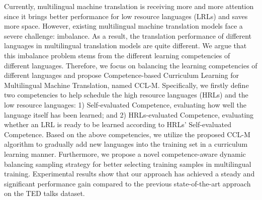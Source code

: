 Currently, multilingual machine translation is receiving more and more attention since it brings better performance for low resource languages (LRLs) and saves more space. However, existing multilingual machine translation models face a severe challenge: imbalance. As a result, the translation performance of different languages in multilingual translation models are quite different. We argue that this imbalance problem stems from the different learning competencies of different languages. Therefore, we focus on balancing the learning competencies of different languages and propose Competence-based Curriculum Learning for Multilingual Machine Translation, named CCL-M. Specifically, we firstly define two competencies to help schedule the high resource languages (HRLs) and the low resource languages: 1) Self-evaluated Competence, evaluating how well the language itself has been learned; and 2) HRLs-evaluated Competence, evaluating whether an LRL is ready to be learned according to HRLs' Self-evaluated Competence. Based on the above competencies, we utilize the proposed CCL-M algorithm to gradually add new languages into the training set in a curriculum learning manner. Furthermore, we propose a novel competence-aware dynamic balancing sampling strategy for better selecting training samples in multilingual training. Experimental results show that our approach has achieved a steady and significant performance gain compared to the previous state-of-the-art approach on the TED talks dataset.
